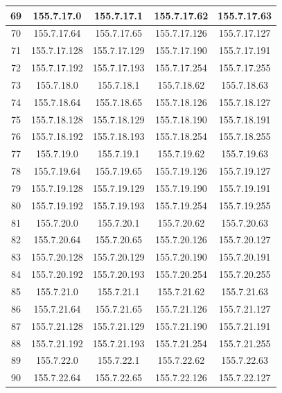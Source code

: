 \documentclass[letterpaper,12pt]{article}
\begin{document}
\begin{longtable}{|c|c|c|c|c|}
        69 & 155.7.17.0 & 155.7.17.1 & 155.7.17.62 & 155.7.17.63 \\ \hline
        70 & 155.7.17.64 & 155.7.17.65 & 155.7.17.126 & 155.7.17.127 \\ \hline
        71 & 155.7.17.128 & 155.7.17.129 & 155.7.17.190 & 155.7.17.191 \\ \hline
        72 & 155.7.17.192 & 155.7.17.193 & 155.7.17.254 & 155.7.17.255 \\ \hline
        73 & 155.7.18.0 & 155.7.18.1 & 155.7.18.62 & 155.7.18.63 \\ \hline
        74 & 155.7.18.64 & 155.7.18.65 & 155.7.18.126 & 155.7.18.127 \\ \hline
        75 & 155.7.18.128 & 155.7.18.129 & 155.7.18.190 & 155.7.18.191 \\ \hline
        76 & 155.7.18.192 & 155.7.18.193 & 155.7.18.254 & 155.7.18.255 \\ \hline
        77 & 155.7.19.0 & 155.7.19.1 & 155.7.19.62 & 155.7.19.63 \\ \hline
        78 & 155.7.19.64 & 155.7.19.65 & 155.7.19.126 & 155.7.19.127 \\ \hline
        79 & 155.7.19.128 & 155.7.19.129 & 155.7.19.190 & 155.7.19.191 \\ \hline
        80 & 155.7.19.192 & 155.7.19.193 & 155.7.19.254 & 155.7.19.255 \\ \hline
        81 & 155.7.20.0 & 155.7.20.1 & 155.7.20.62 & 155.7.20.63 \\ \hline
        82 & 155.7.20.64 & 155.7.20.65 & 155.7.20.126 & 155.7.20.127 \\ \hline
        83 & 155.7.20.128 & 155.7.20.129 & 155.7.20.190 & 155.7.20.191 \\ \hline
        84 & 155.7.20.192 & 155.7.20.193 & 155.7.20.254 & 155.7.20.255 \\ \hline
        85 & 155.7.21.0 & 155.7.21.1 & 155.7.21.62 & 155.7.21.63 \\ \hline
        86 & 155.7.21.64 & 155.7.21.65 & 155.7.21.126 & 155.7.21.127 \\ \hline
        87 & 155.7.21.128 & 155.7.21.129 & 155.7.21.190 & 155.7.21.191 \\ \hline
        88 & 155.7.21.192 & 155.7.21.193 & 155.7.21.254 & 155.7.21.255 \\ \hline
        89 & 155.7.22.0 & 155.7.22.1 & 155.7.22.62 & 155.7.22.63 \\ \hline
        90 & 155.7.22.64 & 155.7.22.65 & 155.7.22.126 & 155.7.22.127 \\ \hline

\end{longtable}
\end{document}
